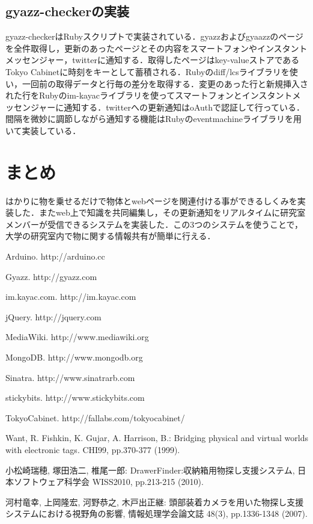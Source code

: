 \subsection{gyazz-checkerの実装}
gyazz-checkerはRubyスクリプトで実装されている．gyazzおよびgyaazzのページを全件取得し，更新のあったページとその内容をスマートフォンやインスタントメッセンジャー，twitterに通知する．取得したページはkey-valueストアであるTokyo Cabinetに時刻をキーとして蓄積される．Rubyのdiff/lcsライブラリを使い，一回前の取得データと行毎の差分を取得する．変更のあった行と新規挿入された行をRubyのim-kayacライブラリを使ってスマートフォンとインスタントメッセンジャーに通知する．twitterへの更新通知はoAuthで認証して行っている．間隔を微妙に調節しながら通知する機能はRubyのeventmachineライブラリを用いて実装している．


\section{まとめ}
はかりに物を乗せるだけで物体とwebページを関連付ける事ができるしくみを実装した．またweb上で知識を共同編集し，その更新通知をリアルタイムに研究室メンバーが受信できるシステムを実装した．この3つのシステムを使うことで，大学の研究室内で物に関する情報共有が簡単に行える．


\begin{thebibliography}{10}

Arduino. http://arduino.cc

Gyazz. http://gyazz.com

im.kayac.com. http://im.kayac.com

jQuery. http://jquery.com

MediaWiki. http://www.mediawiki.org

MongoDB. http://www.mongodb.org

Sinatra. http://www.sinatrarb.com

stickybits. http://www.stickybits.com

TokyoCabinet. http://fallabs.com/tokyocabinet/

Want, R. Fishkin, K. Gujar, A. Harrison, B.: Bridging physical and virtual worlds with electronic tags. CHI99, pp.370-377 (1999).

小松崎瑞穂, 塚田浩二, 椎尾一郎: DrawerFinder:収納箱用物探し支援システム, 日本ソフトウェア科学会 WISS2010, pp.213-215 (2010).

河村竜幸, 上岡隆宏, 河野恭之, 木戸出正継: 頭部装着カメラを用いた物探し支援システムにおける視野角の影響, 情報処理学会論文誌 48(3), pp.1336-1348 (2007).

\end{thebibliography}

